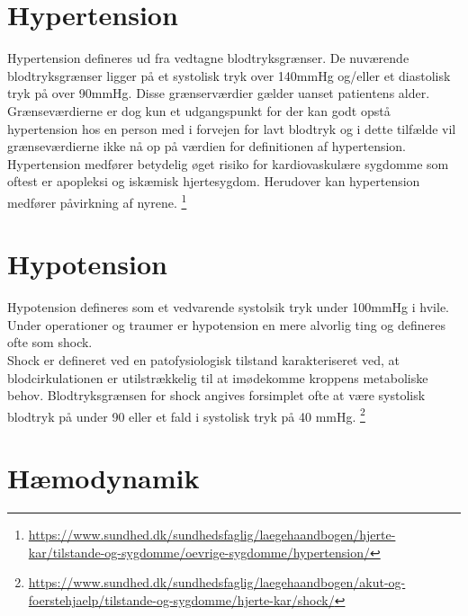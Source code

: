\section{Hypertension}
Hypertension defineres ud fra vedtagne blodtryksgrænser. De nuværende blodtryksgrænser ligger på et systolisk tryk over 140mmHg og/eller et diastolisk tryk på over 90mmHg. Disse grænserværdier gælder uanset patientens alder. Grænseværdierne er dog kun et udgangspunkt for der kan godt opstå hypertension hos en person med i forvejen for lavt blodtryk og i dette tilfælde vil grænseværdierne ikke nå op på værdien for definitionen af hypertension.\\
Hypertension medfører betydelig øget risiko for kardiovaskulære sygdomme som oftest er apopleksi og iskæmisk hjertesygdom. Herudover kan hypertension medfører påvirkning af nyrene.
\footnote{\url{https://www.sundhed.dk/sundhedsfaglig/laegehaandbogen/hjerte-kar/tilstande-og-sygdomme/oevrige-sygdomme/hypertension/}} 

\section{Hypotension}
Hypotension defineres som et vedvarende systolsik tryk under 100mmHg i hvile. \\
Under operationer og traumer er hypotension en mere alvorlig ting og defineres ofte som shock.\\
Shock er defineret ved en patofysiologisk tilstand karakteriseret ved, at blodcirkulationen er utilstrækkelig til at imødekomme kroppens metaboliske behov. Blodtryksgrænsen for shock angives forsimplet ofte at være systolisk blodtryk på under 90 eller et fald i systolisk tryk på 40 mmHg.
\footnote{\url{https://www.sundhed.dk/sundhedsfaglig/laegehaandbogen/akut-og-foerstehjaelp/tilstande-og-sygdomme/hjerte-kar/shock/}}

\section{Hæmodynamik}

